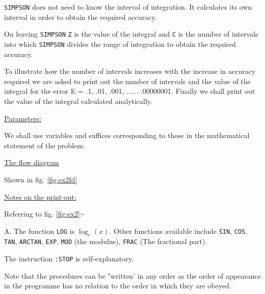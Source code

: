 \documentclass[10pt, a4paper, oneside]{article}
\newcommand{\myuline}[1]{\uline{#1}}
\newcommand{\mytt}[1]{\texttt{\footnotesize #1}}
\begin{document}
\begin{multicols}{2}
\mytt{SIMPSON} does not need to know the interval
of integration.  It calculates its own interval in
order to obtain the required accuracy.

\columnbreak

On leaving \mytt{SIMPSON} \mytt{Z} is the value of the
integral and \mytt{C} is the number of intervals into which
\mytt{SIMPSON} divides the range of integration to obtain the
required accuracy.

To illustrate how the number of intervals
increases with the increase in accuracy required we
are asked to print out the number of intervals and the
value of the integral for the error E = .1, .01, .001,
...... .00000001.  Finally we shall print out the
value of the integral calculated analytically.

\begin{flushleft}
\myuline{Parameters:}
\end{flushleft}

We shall use variables and suffices
corresponding to those in the mathematical statement
of the problem.

\begin{flushleft}
\myuline{The flow diagram}
\end{flushleft}

Shown in fig. \ref{fig:ex2fd}

\begin{flushleft}
\myuline{Notes on the print-out:}
\end{flushleft}

Referring to fig. \ref{fig:ex2}:-

A. The function \mytt{LOG} is $\log_{e}(x)$.  Other functions
available include \mytt{SIN}, \mytt{COS}, \mytt{TAN}, \mytt{ARCTAN}, \mytt{EXP}, \mytt{MOD}
(the modulus), \mytt{FRAC} (The fractional part).

The instruction \mytt{:STOP} is self-explanatory.

Note that the procedures can be "written' in
any order as the order of appearance in the programme
has no relation to the order in which they are obeyed.

\end{multicols}

\end{document}
